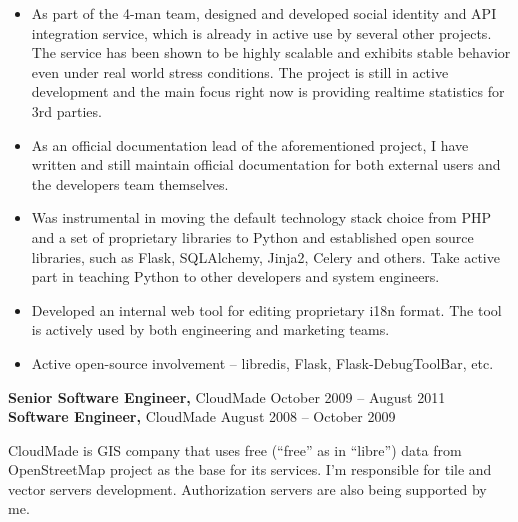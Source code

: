 \documentclass[margin]{res}
\begin{document}
\begin{resume}
\begin{itemize} \itemsep -1pt
\item As part of the 4-man team, designed and developed social identity
  and API integration service, which is already in active use by several
  other projects. The service has been shown to be highly scalable and
  exhibits stable behavior even under real world stress conditions.
  The project is still in active development and the main focus right
  now is providing realtime statistics for 3rd parties.
\item As an official documentation lead of the aforementioned project,
  I have written and still maintain official documentation for both external
  users and the developers team themselves.
\item Was instrumental in moving the default technology stack choice
  from PHP and a set of proprietary libraries to Python and established
  open source libraries, such as Flask, SQLAlchemy, Jinja2, Celery and others.
  Take active part in teaching Python to other developers and system engineers.
\item Developed an internal web tool for editing proprietary i18n format.
  The tool is actively used by both engineering and marketing teams.
\item Active open-source involvement -- libredis, Flask, Flask-DebugToolBar, etc.
\end{itemize}

{\bf Senior Software Engineer,} CloudMade \hfill October 2009 -- August 2011\\
{\bf Software Engineer,} CloudMade \hfill August 2008 -- October 2009

CloudMade is GIS company that uses free
(``free'' as in ``libre'') data from OpenStreetMap project as
the base for its services. I'm responsible for tile and
vector servers development. Authorization servers are also
being supported by me.\\


\end{resume}
\end{document}
